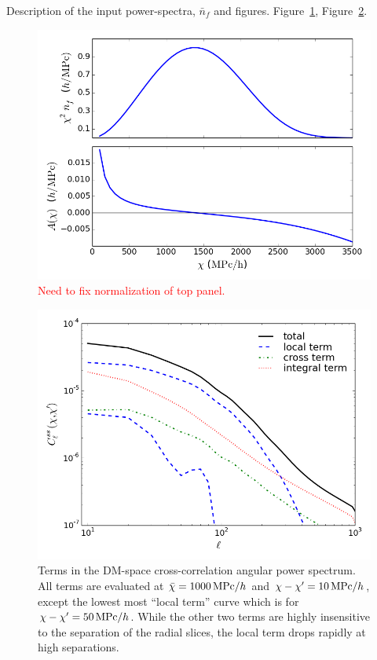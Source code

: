 \documentclass[twocolumn,prl,nofootinbib]{revtex4-1}
\newcommand{\red}{\textcolor{red}}
\begin{document}
Description of the input power-spectra, $\bar n_f$ and figures.
Figure~\ref{f:n_f}, Figure~\ref{f:terms}.

\begin{figure}
    \includegraphics[scale=0.42]{"figures/n_f"}
    \caption{
        \label{f:n_f}
        \red{Need to fix normalization of top panel.}
    }
\end{figure}

\begin{figure}
    \includegraphics[scale=0.42]{"figures/terms"}
    \caption{
        \label{f:terms}
        Terms in the DM-space cross-correlation angular power spectrum.
        All terms are evaluated at $\bar\chi=1000\,{\rm MPc}/h$ and 
        $\chi - \chi' = 10\,{\rm MPc}/h$, except the lowest most 
        ``local term'' curve which is for $\chi - \chi'=50\,{\rm MPc}/h$. 
        While
        the other two terms are highly insensitive to the separation of
        the radial slices, the local term drops rapidly at high separations.
    }
\end{figure}
\end{document}
